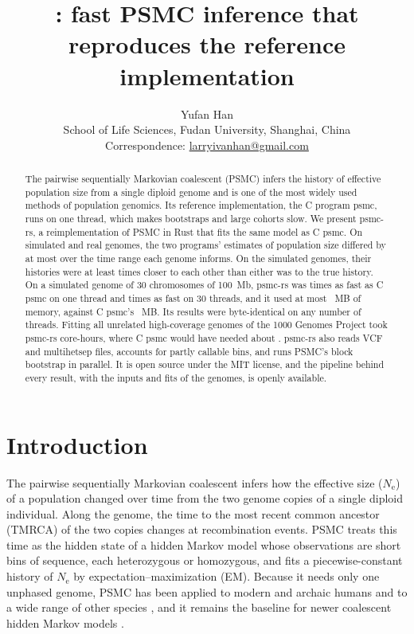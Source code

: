\documentclass[11pt]{article}
\title{\psmcrs: fast PSMC inference that reproduces the reference implementation}
\author{Yufan Han\\[2pt]
  \small School of Life Sciences, Fudan University, Shanghai, China\\
  \small Correspondence: \href{mailto:larryivanhan@gmail.com}{larryivanhan@gmail.com}}
\date{}
\newcommand{\psmcrs}{psmc-rs}
\newcommand{\Ne}{\ensuremath{N_\mathrm{e}}}
\begin{document}
\maketitle
\linenumbers
\onehalfspacing

\begin{abstract}
\noindent The pairwise sequentially Markovian coalescent (PSMC) infers the history of effective population size from a single diploid genome and is one of the most widely used methods of population genomics. Its reference implementation, the C program psmc, runs on one thread, which makes bootstraps and large cohorts slow. We present \psmcrs{}, a reimplementation of PSMC in Rust that fits the same model as C psmc. On \EoneGenomes{} simulated and \RealGenomes{} real genomes, the two programs' estimates of population size differed by at most \AgreeMaxPct{} over the time range each genome informs. On the simulated genomes, their histories were at least \EoneFoldMin{} times closer to each other than either was to the true history. On a simulated genome of 30 chromosomes of 100~Mb, \psmcrs{} was \EthreeSpeedOne{} times as fast as C psmc on one thread and \EthreeSpeedThirty{} times as fast on 30 threads, and it used at most \EthreeRsMemThirty{}~MB of memory, against C psmc's \EthreeCMem{}~MB. Its results were byte-identical on any number of threads. Fitting all \EsevenGenomes{} unrelated high-coverage genomes of the 1000 Genomes Project took \psmcrs{} \EsevenRsCoreHours{} core-hours, where C psmc would have needed about \EsevenCCoreHoursAll{}. \psmcrs{} also reads VCF and multihetsep files, accounts for partly callable bins, and runs PSMC's block bootstrap in parallel. It is open source under the MIT license, and the pipeline behind every result, with the inputs and fits of the \EsevenGenomes{} genomes, is openly available.
\end{abstract}

\section*{Introduction}

The pairwise sequentially Markovian coalescent \citep[PSMC;][]{li2011} infers how the effective size (\Ne) of a population changed over time from the two genome copies of a single diploid individual. Along the genome, the time to the most recent common ancestor (TMRCA) of the two copies changes at recombination events. PSMC treats this time as the hidden state of a hidden Markov model whose observations are short bins of sequence, each heterozygous or homozygous, and fits a piecewise-constant history of \Ne{} by expectation--maximization (EM). Because it needs only one unphased genome, PSMC has been applied to modern and archaic humans \citep{li2011,prufer2014,mallick2016} and to a wide range of other species \citep{nadachowska2016,hilgers2025}, and it remains the baseline for newer coalescent hidden Markov models \citep{schiffels2014,terhorst2017,cousins2025,terhorst2025}.
\end{document}
